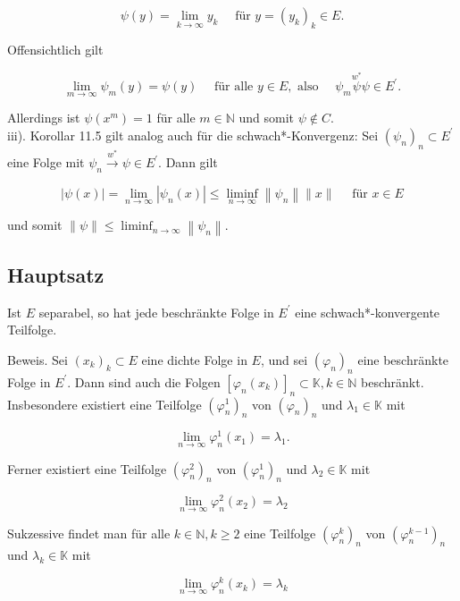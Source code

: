 \documentclass[10pt, letterpaper]{article}
\begin{document}
$$
\psi(y)=\lim _{k \rightarrow \infty} y_{k} \quad \text { für } y=\left(y_{k}\right)_{k} \in E .
$$

Offensichtlich gilt

$$
\lim _{m \rightarrow \infty} \psi_{m}(y)=\psi(y) \quad \text { für alle } y \in E, \text { also } \quad \psi_{m} \stackrel{w^{*}}{\psi} \psi \in E^{\prime} .
$$

Allerdings ist $\psi\left(x^{m}\right)=1$ für alle $m \in \mathbb{N}$ und somit $\psi \notin C$.\\
iii). Korollar 11.5 gilt analog auch für die schwach*-Konvergenz: Sei $\left(\psi_{n}\right)_{n} \subset E^{\prime}$ eine Folge mit $\psi_{n} \xrightarrow{w^{*}} \psi \in E^{\prime}$. Dann gilt

$$
|\psi(x)|=\lim _{n \rightarrow \infty}\left|\psi_{n}(x)\right| \leq \liminf _{n \rightarrow \infty}\left\|\psi_{n}\right\|\|x\| \quad \text { für } x \in E
$$

und somit $\|\psi\| \leq \liminf _{n \rightarrow \infty}\left\|\psi_{n}\right\|$.

\subsection*{Hauptsatz}
Ist $E$ separabel, so hat jede beschränkte Folge in $E^{\prime}$ eine schwach*-konvergente Teilfolge.

Beweis. Sei $\left(x_{k}\right)_{k} \subset E$ eine dichte Folge in $E$, und sei $\left(\varphi_{n}\right)_{n}$ eine beschränkte Folge in $E^{\prime}$. Dann sind auch die Folgen $\left[\varphi_{n}\left(x_{k}\right)\right]_{n} \subset \mathbb{K}, k \in \mathbb{N}$ beschränkt. Insbesondere existiert eine Teilfolge $\left(\varphi_{n}^{1}\right)_{n}$ von $\left(\varphi_{n}\right)_{n}$ und $\lambda_{1} \in \mathbb{K}$ mit

$$
\lim _{n \rightarrow \infty} \varphi_{n}^{1}\left(x_{1}\right)=\lambda_{1} .
$$

Ferner existiert eine Teilfolge $\left(\varphi_{n}^{2}\right)_{n}$ von $\left(\varphi_{n}^{1}\right)_{n}$ und $\lambda_{2} \in \mathbb{K}$ mit

$$
\lim _{n \rightarrow \infty} \varphi_{n}^{2}\left(x_{2}\right)=\lambda_{2}
$$

Sukzessive findet man für alle $k \in \mathbb{N}, k \geq 2$ eine Teilfolge $\left(\varphi_{n}^{k}\right)_{n}$ von $\left(\varphi_{n}^{k-1}\right)_{n}$ und $\lambda_{k} \in \mathbb{K}$ mit

$$
\lim _{n \rightarrow \infty} \varphi_{n}^{k}\left(x_{k}\right)=\lambda_{k}
$$
\end{document}

